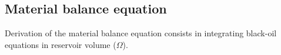 \documentclass[final,authoryear,5p,twocolumn,10pt]{elsarticle}
\begin{document}
\subsection{Material balance equation}

Derivation of the material balance equation consists in integrating black-oil equations in reservoir volume ($\Omega$).


\end{document}
